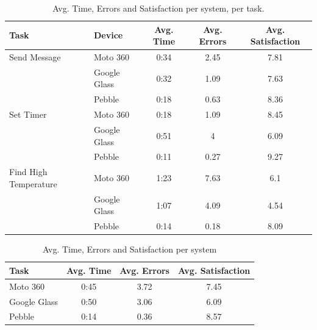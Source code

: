 \documentclass[11pt,a4paper]{scrartcl}
\begin{document}
\begin{appendices}
\begin{table}[h]
\caption{Avg. Time, Errors and Satisfaction per system, per task.} 
\centering
\begin{tabular}{@{}llccc@{}}
\toprule
Task & Device & Avg. Time & Avg. Errors & Avg. Satisfaction \\ \midrule
Send Message & Moto 360 & 0:34 & 2.45 & 7.81 \\
 & Google Glass & 0:32 & 1.09 & 7.63 \\
 & Pebble & 0:18 & 0.63 & 8.36 \\
Set Timer & Moto 360 & 0:18 & 1.09 & 8.45 \\
 & Google Glass & 0:51 & 4 & 6.09 \\
 & Pebble & 0:11 & 0.27 & 9.27 \\
Find High Temperature & Moto 360 & 1:23 & 7.63 & 6.1 \\
 & Google Glass & 1:07 & 4.09 & 4.54 \\
 & Pebble & 0:14 & 0.18 & 8.09
\end{tabular}
\end{table}

\begin{table}[h]
\caption{Avg. Time, Errors and Satisfaction per system} 
\centering
\begin{tabular}{@{}lccc@{}}
\toprule
Task & Avg. Time & Avg. Errors & Avg. Satisfaction \\ \midrule
Moto 360 & 0:45 & 3.72 & 7.45 \\
Google Glass & 0:50 & 3.06 & 6.09 \\
Pebble & 0:14 & 0.36 & 8.57
\end{tabular}
\end{table}

\end{appendices}
\end{document}
